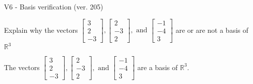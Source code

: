 \begin{exercise}
  \begin{exerciseTitle}V6 - Basis verification (ver. 205)\end{exerciseTitle}
  \begin{exerciseStatement}
    Explain why the vectors \(\left[\begin{array}{r}
3 \\
2 \\
-3
\end{array}\right] , \left[\begin{array}{r}
2 \\
-3 \\
2
\end{array}\right] , \text{ and } \left[\begin{array}{r}
-1 \\
-4 \\
3
\end{array}\right]\) are or are not a basis of \(\mathbb{R}^3\)	


  \end{exerciseStatement}
  \begin{exerciseAnswer}
   The vectors \(\left[\begin{array}{r}
3 \\
2 \\
-3
\end{array}\right] , \left[\begin{array}{r}
2 \\
-3 \\
2
\end{array}\right] , \text{ and } \left[\begin{array}{r}
-1 \\
-4 \\
3
\end{array}\right]\) 
  	 are  a basis of \(\mathbb{R}^3\).
  


  \end{exerciseAnswer}
\end{exercise}